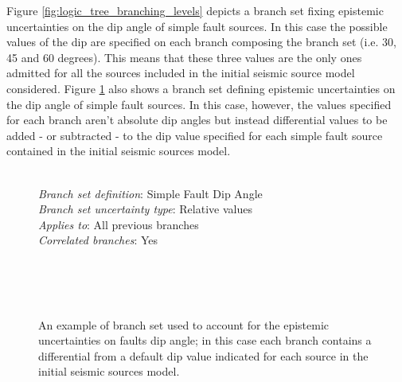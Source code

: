 Figure \ref{fig:logic_tree_branching_levels} depicts a branch 
set fixing epistemic uncertainties on the dip angle of simple 
fault sources. In this case the possible values of the dip are specified
on each branch composing the branch set (i.e. 30, 45 and 60 degrees). This 
means that these three values are the only ones admitted for all the sources 
included in the initial seismic source model considered. 
%
Figure \ref{fig:logic_tree_branching_levels_1} also shows a branch
set defining epistemic uncertainties on the dip angle 
of simple fault sources. In this case, however, the values specified for each 
branch aren't absolute dip angles but instead differential values to be added - 
or subtracted - to the dip value specified for each simple fault source 
contained in the initial seismic sources model.

\renewcommand{\psedge}{\ncdiag[armA=0,angleB=180,armB=1cm]}
\begin{figure}
\hfill \\
\textcolor{blue01}{\emph{Branch set definition}}: \dotfill
	Simple Fault Dip Angle \\
\textcolor{blue01}{\emph{Branch set uncertainty type}}: \dotfill
	Relative values \\
\textcolor{blue01}{\emph{Applies to}}: \dotfill
	All previous branches \\
\textcolor{blue01}{\emph{Correlated branches}}: \dotfill Yes \\
\hfill \\
	\centering
	\begin{psTree}[treemode=R,levelsep=*2cm]
			{\Tr{ }}
		\begin{psTree}[treemode=R]{
			}%
		\end{psTree}%
		\begin{psTree}[treemode=R,treenodesize=1cm]{
			\Tr{\parbox[b]{4cm}{ value = 0$^\circ$ 
				\newline weight=w$_2$}}}%
		\end{psTree}%
		\begin{psTree}[treemode=R]{
			\Tr{\parbox[b]{4cm}{ value = +15$^\circ$ 
				\newline weight=w$_3$}}}%
		\end{psTree}%
	\end{psTree}%
\\ \hfill \\
\caption{An example of branch set used to account for the epistemic 
uncertainties on faults dip angle; in this case each branch contains a 
differential from a default dip value indicated for each source in the 
initial seismic sources model.}
\label{fig:logic_tree_branching_levels_1}
\end{figure}
